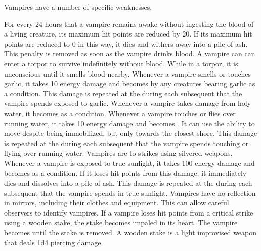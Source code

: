             Vampires have a number of specific weaknesses.
        \begin{itemize}
             For every 24 hours that a vampire remains awake without ingesting the blood of a living creature, its maximum hit points are reduced by 20.
            If its maximum hit points are reduced to 0 in this way, it dies and withers away into a pile of ash.
            This penalty is removed as soon as the vampire drinks blood.
            A vampire can can enter a torpor to survive indefinitely without blood.
            While in a torpor, it is unconscious until it smells blood nearby.
             Whenever a vampire smells or touches garlic, it takes 10 energy damage and becomes \frightened by any creatures bearing garlic as a condition.
            This damage is repeated at the during each subsequent  that the vampire spends exposed to garlic.
             Whenever a vampire takes damage from holy water, it becomes \stunned as a condition.
             Whenever a vampire touches or flies over running water, it takes 10 energy damage and  becomes \immobilized.
            It can use the  ability to move despite being immobilized, but only towards the closest shore.
            This damage is repeated at the during each subsequent  that the vampire spends touching or flying over running water.
             Vampires are \vulnerable to strikes using silvered weapons.
             Whenever a vampire is exposed to true sunlight, it takes 100 energy damage and becomes \blinded as a condition.
            If it loses hit points from this damage, it immediately dies and dissolves into a pile of ash.
            This damage is repeated at the during each subsequent  that the vampire spends in true sunlight.
             Vampires have no reflection in mirrors, including their clothes and equipment.
            This can allow careful observers to identify vampires.
             If a vampire loses hit points from a critical strike using a wooden stake, the stake becomes impaled in its heart.
            The vampire becomes \paralyzed until the stake is removed.
            A wooden stake is a light improvised weapon that deals 1d4 piercing damage.
        \end{itemize}

